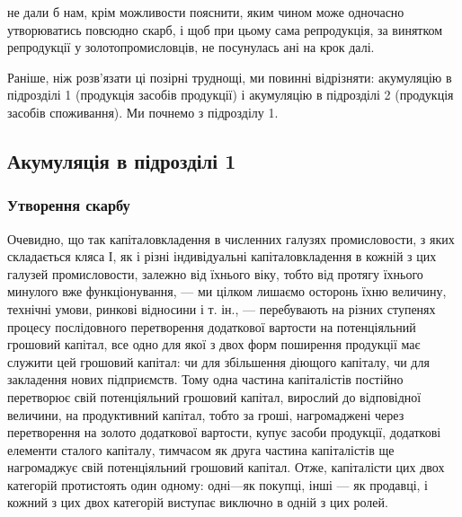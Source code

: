 \parcont{}  %
не дали б нам, крім можливости пояснити, яким чином може одночасно
утворюватись повсюдно скарб, і щоб при цьому сама репродукція, за
винятком репродукції у золотопромисловців, не посунулась ані на
крок далі.

Раніше, ніж розв’язати ці позірні труднощі, ми повинні відрізняти:
акумуляцію в підрозділі 1 (продукція засобів продукції) і акумуляцію
в підрозділі 2 (продукція засобів споживання). Ми почнемо з підрозділу
1.

\subsection{Акумуляція в підрозділі 1}

\subsubsection{Утворення скарбу}

Очевидно, що так капіталовкладення в численних галузях промисловости,
з яких складається кляса І, як і різні індивідуальні капіталовкладення
в кожній з цих галузей промисловости, залежно від їхнього віку,
тобто від протягу їхнього минулого вже функціонування, — ми цілком
лишаємо осторонь їхню величину, технічні умови, ринкові відносини
і т. ін., — перебувають на різних ступенях процесу послідовного перетворення
додаткової вартости на потенціяльний грошовий капітал, все одно
для якої з двох форм поширення продукції має служити цей грошовий
капітал: чи для збільшення діющого капіталу, чи для закладення нових підприємств.
Тому одна частина капіталістів постійно перетворює свій потенціяльний
грошовий капітал, вирослий до відповідної величини, на продуктивний
капітал, тобто за гроші, нагромаджені через перетворення на
золото додаткової вартости, купує засоби продукції, додаткові елементи
сталого капіталу, тимчасом як друга частина капіталістів ще нагромаджує
свій потенціяльний грошовий капітал. Отже, капіталісти цих двох категорій
протистоять один одному: одні---як покупці, інші — як продавці, і
кожний з цих двох категорій виступає виключно в одній з цих ролей.

